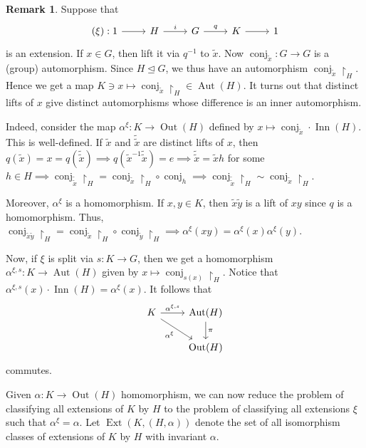 \documentclass[10pt,letterpaper,cm]{nupset}
\theoremstyle{definition}
\newtheorem{remark}{Remark}
\newcommand{\1}{\mathbf{1}}
\newcommand{\0}{\vec 0}
\DeclareMathOperator{\aut}{Aut}
\DeclareMathOperator{\ext}{Ext}
\DeclareMathOperator{\inn}{Inn}
\DeclareMathOperator{\out}{Out}
\DeclareMathOperator{\conj}{conj}
\begin{document}
\begin{remark} 
Suppose that 
\[ 
\begin{tikzcd}
(\xi): 1 \arrow[r] & H \arrow[r, "i"] & G \arrow[r, "q"] & K \arrow[r] & 1
\end{tikzcd}
\]
is an extension. If $x \in G$, then lift it via $q^{-1}$ to $\tilde{x}$. Now $\conj_{\tilde{x}} : G \to G$ is a (group) automorphism. Since $H\unlhd G$, we thus have an automorphism $\conj_{\tilde{x}}\restriction_H$. Hence we get a map $K \ni x \mapsto \conj_{\tilde{x}}\restriction_H \in \aut(H)$. It turns out that distinct lifts of $x$ give distinct automorphisms whose difference is an inner automorphism.

Indeed, consider the map $\alpha^{\xi} : K \to \out(H)$ defined by $x \mapsto \conj_{\tilde{x}}\cdot \inn(H)$. This is well-defined. If $\tilde{x}$ and $\tilde{\tilde{x}}$ are distinct lifts of $x$, then $q(\tilde{x}) = x = q(\tilde{\tilde{x}}) \implies q(\tilde{x}^{-1}\tilde{\tilde{x}}) = e \implies \tilde{\tilde{x}} = \tilde{x}h$ for some $h \in H \implies \conj_{\tilde{\tilde{x}}}\restriction_H= \conj_{\tilde{x}}\restriction_H \circ \conj_h \implies \conj_{\tilde{\tilde{x}}}\restriction_H\sim \conj_{\tilde{x}}\restriction_H$.

Moreover, $\alpha^{\xi}$ is a homomorphism. If $x, y \in K$, then $\tilde{x}\tilde{y}$ is a lift of $xy$ since $q$ is a homomorphism.  Thus, $\conj_{\tilde{x}\tilde{y}}\restriction_H = \conj_{\tilde{x}}\restriction_H \circ \conj_{\tilde{y}}\restriction_H \implies \alpha^{\xi}(xy) = \alpha^{\xi}(x) \alpha^{\xi}(y)$.

Now, if $\xi$ is split via $s: K \to G$, then we get a homomorphism $\alpha^{\xi, s} : K \to \aut(H)$ given by $x \mapsto \conj_{s(x)}\restriction_H$. Notice that $\alpha^{\xi, s}(x)\cdot \inn(H) = \alpha^{\xi}(x)$. It follows that 
\[
\begin{tikzcd}
K \arrow[r, "{\alpha^{\xi, s}}"] \arrow[rd, "\alpha^{\xi}"'] & \aut(H) \arrow[d, "\pi"] \\
 & \out(H)
\end{tikzcd}
\]
commutes.

Given $\alpha: K \to \out(H)$ homomorphism, we can now reduce the problem of classifying all extensions of $K$ by $H$ to the problem of classifying all extensions $\xi$ such that $\alpha^{\xi} = \alpha$. 
Let $\ext(K, (H, \alpha))$ denote the set of all isomorphism classes of extensions of $K$ by $H$ with invariant $\alpha$.
\end{remark}
\end{document}
